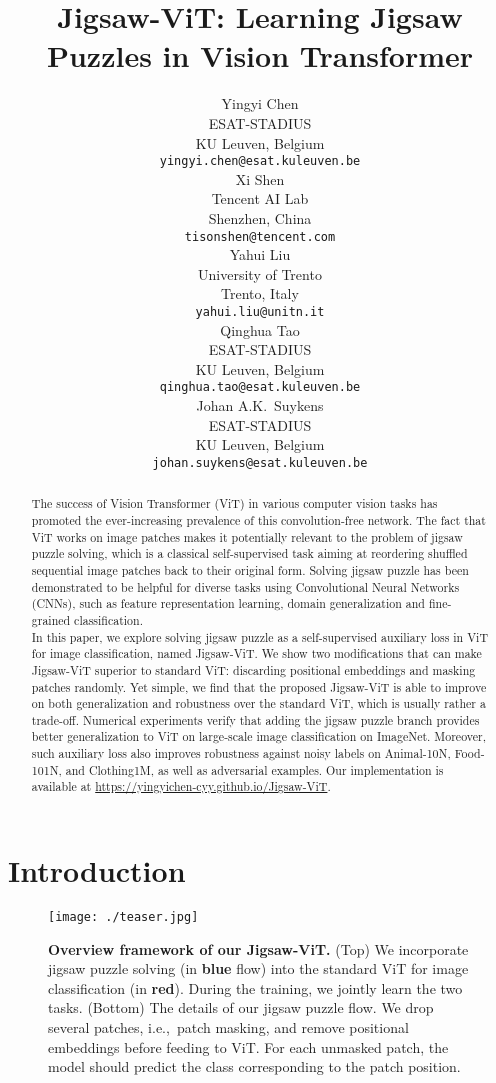 \documentclass{article}
\title{Jigsaw-ViT: Learning Jigsaw Puzzles in Vision Transformer}
\author{
  Yingyi Chen \\
  ESAT-STADIUS \\
  KU Leuven, Belgium \\
  \texttt{yingyi.chen@esat.kuleuven.be} \\
  \And
  Xi Shen \\
  Tencent AI Lab \\
  Shenzhen, China \\
  \texttt{tisonshen@tencent.com} \\
  \AND 
  Yahui Liu \\
  University of Trento \\
  Trento, Italy \\
  \texttt{yahui.liu@unitn.it} \\
  \And
  Qinghua Tao \\
  ESAT-STADIUS \\
  KU Leuven, Belgium \\
  \texttt{qinghua.tao@esat.kuleuven.be} \\
  \And
  Johan A.K.~Suykens \\
  ESAT-STADIUS \\
  KU Leuven, Belgium \\
  \texttt{johan.suykens@esat.kuleuven.be} \\
}
\begin{document}
\maketitle

\begin{abstract}
    The success of Vision Transformer (ViT) in various computer vision tasks has promoted the ever-increasing prevalence of this convolution-free network.
    The fact that ViT works on image patches makes it potentially relevant to the problem of jigsaw puzzle solving, which is a classical self-supervised task aiming at reordering shuffled sequential image patches back to their original form. Solving jigsaw puzzle has been demonstrated to be helpful for diverse tasks using Convolutional Neural Networks (CNNs), such as feature representation learning, domain generalization and fine-grained classification. 
    \\
    In this paper, we explore solving jigsaw puzzle as a self-supervised auxiliary loss in ViT for image classification, named Jigsaw-ViT. We show two modifications that can make Jigsaw-ViT superior to standard ViT: discarding positional embeddings and masking patches randomly. Yet simple, we find that the proposed Jigsaw-ViT is able to improve on both generalization and robustness over the standard ViT, which is usually rather a trade-off. Numerical experiments verify that adding the jigsaw puzzle branch provides better generalization to ViT on large-scale image classification on ImageNet. Moreover, such auxiliary loss also improves robustness against noisy labels on Animal-10N, Food-101N, and Clothing1M, as well as adversarial examples. 
    Our implementation is available at \url{https://yingyichen-cyy.github.io/Jigsaw-ViT}.
\end{abstract}




\section{Introduction}
\label{sec:introduction}

\begin{figure}[t]
	\centering    
	{\texttt{[image: ./teaser.jpg]}\label{fig:jigsaw}}\hfill
	\caption{\textbf{Overview framework of our Jigsaw-ViT.} 
	(Top) We incorporate jigsaw puzzle solving (in \textbf{\textcolor{NavyBlue}{blue}} flow) into the standard ViT for image classification (in \textbf{\textcolor{BrickRed}{red}}). During the training, we jointly learn the two tasks.
	(Bottom) The details of our jigsaw puzzle flow. We drop several patches, i.e.,~patch masking, and remove positional embeddings before feeding to ViT. For each unmasked patch, the model should predict the class corresponding to the patch position.}
	\label{fig::overview}
\end{figure}
	    
\end{document}

